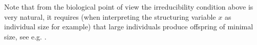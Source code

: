 \documentclass[12pt,a4paper]{amsart}
\newtheorem{theorem}{Theorem}[section]
\begin{document}
\noindent Note that from the biological point of view the irreducibility condition above is very natural, it requires (when interpreting the structuring variable $x$ as individual size for example) that large individuals produce offspring of minimal size, see e.g. \cite{CDF}. 


%
%
\end{document}
